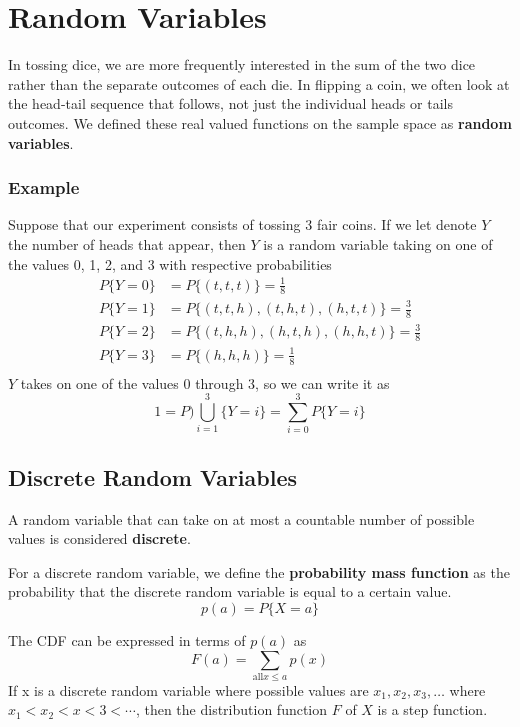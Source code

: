\setcounter{chapter}{3}
\chapter{Random Variables}
In tossing dice, we are more frequently interested in the sum of the two dice rather than the separate outcomes of each die. In flipping a coin, we often look at the head-tail sequence that follows, not just the individual heads or tails outcomes. We defined these real valued functions on the sample space as \textbf{random variables}.

\subsection*{Example}
Suppose that our experiment consists of tossing 3 fair coins. If we let denote $Y$ the number of heads that appear, then $Y$ is a random variable taking on one of the values 0, 1, 2, and 3 with respective probabilities
\begin{equation*}
    \begin{split}
        P\{Y = 0\} &= P\{(t,t,t)\} = \frac{1}{8}\\
        P\{Y = 1\} &= P\{(t,t,h),(t,h,t),(h,t,t)\} = \frac{3}{8}\\
        P\{Y = 2\} &= P\{(t,h,h), (h,t,h), (h,h,t)\} = \frac{3}{8}\\
        P\{Y = 3\} &= P\{(h,h,h)\} = \frac{1}{8}\\
    \end{split}
\end{equation*}
$Y$ takes on one of the values 0 through 3, so we can write it as 
\[1 = P)\bigcup^3_{i=1} \{Y = i\} = \sum^3_{i=0} P\{Y = i\}\]
\section{Discrete Random Variables}
A random variable that can take on at most a countable number of possible values is considered \textbf{discrete}.
\begin{definition}
For a discrete random variable, we define the \textbf{probability mass function} as the probability that the discrete random variable is equal to a certain value.
\[p(a) = P\{X = a\}\]
\end{definition}
\begin{definition}
    The CDF can be expressed in terms of $p(a)$ as \[F(a) = \sum_{\text{all} x\leq a} p(x)\]
    If x is a discrete random variable where possible values are $x_1,x_2,x_3,\dots$ where $x_1 < x_2 < x < 3 < \cdots$, then the distribution function $F$ of $X$ is a step function. 
\end{definition}
